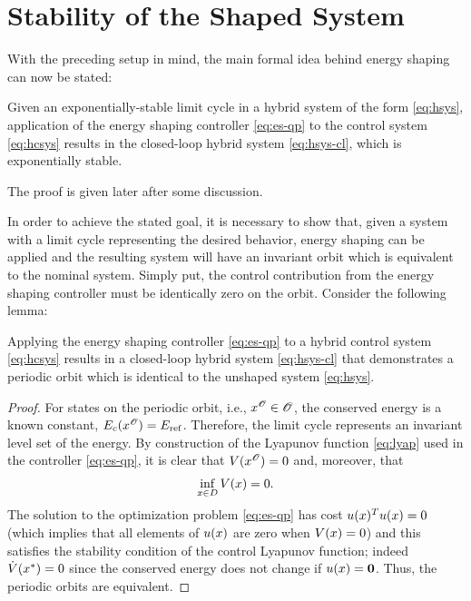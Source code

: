 \section{Stability of the Shaped System} \label{sec:stab}

With the preceding setup in mind, the main formal idea behind energy shaping can
now be stated:
% 
\begin{theorem}
  \label{theorem:main-theorem}
  Given an exponentially-stable limit cycle in a hybrid system of the form
  \eqref{eq:hsys}, application of the energy shaping controller \eqref{eq:es-qp}
  to the control system \eqref{eq:hcsys} results in the closed-loop hybrid
  system \eqref{eq:hsys-cl}, which is exponentially stable.
\end{theorem}
% 

The proof is given later after some discussion.


In order to achieve the stated goal, it is necessary to show that, given a
system with a limit cycle representing the desired behavior, energy shaping can
be applied and the resulting system will have an invariant orbit which is
equivalent to the nominal system. Simply put, the control contribution from the
energy shaping controller must be identically zero on the orbit. Consider the
following lemma:

\begin{lemma}
  Applying the energy shaping controller \eqref{eq:es-qp} to a hybrid control
  system \eqref{eq:hcsys} results in a closed-loop hybrid system
  \eqref{eq:hsys-cl} that demonstrates a periodic orbit which is identical to
  the unshaped system \eqref{eq:hsys}.
\end{lemma}

\begin{proof}
  For states on the periodic orbit, i.e., $x^{\mathscr{O}} \in \mathscr{O}$, the conserved energy
  is a known constant, $E_{c}(x^{\mathscr{O}}) = E_{\mathrm{ref}}$.
  Therefore, the limit cycle represents an invariant level set of the energy.
  By construction of the Lyapunov function \eqref{eq:lyap} used in the
  controller \eqref{eq:es-qp}, it is clear that $V(x^{\mathscr{O}}) = 0$ and, moreover, that
  \begin{align*}
    \inf_{x \in D} V(x) = 0.
  \end{align*}
  The solution to the optimization problem \eqref{eq:es-qp} has cost $u(x)^T
  u(x) = 0$ (which implies that all elements of $u(x)$ are zero when $V(x) =
  0$) and this satisfies the stability condition of the control Lyapunov
  function;
  indeed ${\dot V}(x^{*}) = 0$ since the conserved energy does not change if
  $u(x) = {\mathbf 0}$.
  Thus, the periodic orbits are equivalent.
\end{proof}


